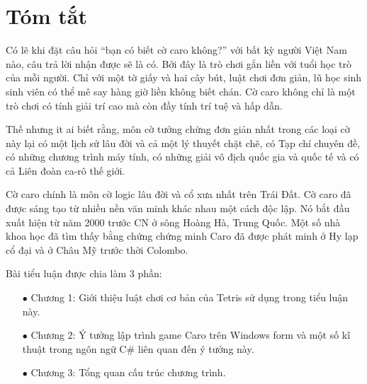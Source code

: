 \chapter*{Tóm tắt}

Có lẽ khi đặt câu hỏi “bạn có biết cờ caro không?” với bất kỳ người Việt Nam nào, câu trả lời nhận được sẽ là có. Bởi đây là trò chơi gắn liền với tuổi học trò của mỗi người. Chỉ với một tờ giấy và hai cây bút, luật chơi đơn giản, lũ học sinh sinh viên có thể mê say hàng giờ liền không biết chán. Cờ caro không chỉ là một trò chơi có tính giải trí cao mà còn đầy tính trí tuệ và hấp dẫn.

Thế nhưng it ai biết rằng, môn cờ tưởng chừng đơn giản nhất trong các loại cờ này lại có một lịch sử lâu đời và cả một lý thuyết chặt chẽ, có Tạp chí chuyên đề, có những chương trình máy tính, có những giải vô địch quốc gia và quốc tế và có cả Liên đoàn ca-rô thế giới.

Cờ caro chính là môn cờ logic lâu đời và cổ xưa nhất trên Trái Đất. Cờ caro đã được sáng tạo từ nhiều nền văn minh khác nhau một cách độc lập. Nó bắt đầu xuất hiện từ năm 2000 trước CN ở sông Hoàng Hà, Trung Quốc. Một số nhà khoa học đã tìm thấy bằng chứng chứng minh Caro đã được phát minh ở Hy lạp cổ đại và ở Châu Mỹ trước thời Colombo.

Bài tiểu luận được chia làm 3 phần:
\begin{itemize}
	\item[$\bullet$] Chương 1: Giới thiệu luật chơi cơ bản của Tetris sử dụng trong tiểu luận này.
	\item[$\bullet$] Chương 2: Ý tưởng lập trình game Caro trên Windows form và một số kĩ thuật trong ngôn ngữ C\# liên quan đến ý tưởng này.
	\item[$\bullet$] Chương 3: Tổng quan cấu trúc chương trình.
\end{itemize}

